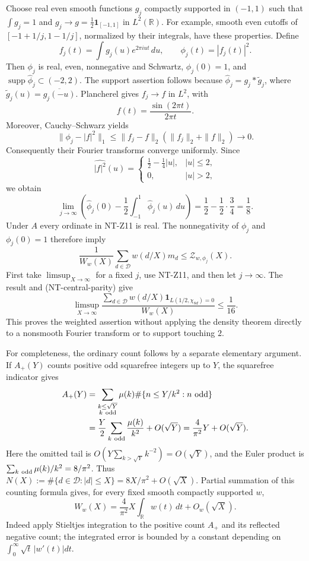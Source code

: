 \documentclass[11pt,a4paper]{article}
\begin{document}
Choose real even smooth functions $g_j$ compactly supported in $(-1,1)$
such that $\int g_j=1$ and
$g_j\to g=\tfrac12\mathbf1_{[-1,1]}$ in $L^2(\mathbb R)$.
For example, smooth even cutoffs of $[-1+1/j,1-1/j]$, normalized by
their integrals, have these properties.  Define
\[
 f_j(t)=\int g_j(u)e^{2\pi iut}\,du,\qquad
 \phi_j(t)=|f_j(t)|^2.
\]
Then $\phi_j$ is real, even, nonnegative and Schwartz,
$\phi_j(0)=1$, and
$\operatorname{supp}\widehat\phi_j\subset(-2,2)$.
The support assertion follows because
$\widehat\phi_j=g_j*\widetilde g_j$, where
$\widetilde g_j(u)=\overline{g_j(-u)}$.
Plancherel gives $f_j\to f$ in $L^2$, with
\[
 f(t)=\frac{\sin(2\pi t)}{2\pi t}.
\]
Moreover, Cauchy--Schwarz yields
\[
 \|\phi_j-|f|^2\|_1
 \le\|f_j-f\|_2(\|f_j\|_2+\|f\|_2)\longrightarrow0.
\]
Consequently their Fourier transforms converge uniformly.  Since
\[
 \widehat{|f|^2}(u)=
 \begin{cases}\tfrac12-\tfrac14|u|,&|u|\le2,\\0,&|u|>2,
 \end{cases}
\]
we obtain
\[
 \lim_{j\to\infty}
 \left(\widehat\phi_j(0)-\frac12
                   \int_{-1}^1\widehat\phi_j(u)\,du\right)
 =\frac12-\frac12\cdot\frac34=\frac18.
\tag{NT-test-limit}
\]
Under $A$ every ordinate in NT-Z11 is real.  The nonnegativity of
$\phi_j$ and $\phi_j(0)=1$ therefore imply
\[
 \frac1{W_w(X)}\sum_{d\in\mathcal D}w(d/X)m_d
 \le\mathcal Z_{w,\phi_j}(X).
\]
First take $\limsup_{X\to\infty}$ for a fixed $j$, use NT-Z11, and
then let $j\to\infty$.  The result and (NT-central-parity) give
\[
 \limsup_{X\to\infty}
 \frac{\sum_{d\in\mathcal D}w(d/X)
               \mathbf1_{L(1/2,\chi_{8d})=0}}{W_w(X)}\le\frac1{16}.
\tag{NT-weighted-vanishing}
\]
This proves the weighted assertion without applying the density theorem
directly to a nonsmooth Fourier transform or to support touching $2$.

For completeness, the ordinary count follows by a separate elementary
argument.  If $A_+(Y)$ counts positive odd squarefree integers up to $Y$,
the squarefree indicator gives
\begin{align*}
 A_+(Y)&=\sum_{\substack{k\le\sqrt Y\\k\ {\rm odd}}}\mu(k)
       \#\{n\le Y/k^2:n\ {\rm odd}\}\\
 &=\frac Y2\sum_{k\ {\rm odd}}\frac{\mu(k)}{k^2}+O(\sqrt Y)
 =\frac4{\pi^2}Y+O(\sqrt Y).
\end{align*}
Here the omitted tail is $O(Y\sum_{k>\sqrt Y}k^{-2})=O(\sqrt Y)$,
and the Euler product is
$\sum_{k\ {\rm odd}}\mu(k)/k^2=8/\pi^2$.
Thus $N(X):=\#\{d\in\mathcal D:|d|\le X\}
 =8X/\pi^2+O(\sqrt X)$.
Partial summation of this counting formula gives, for every fixed
smooth compactly supported $w$,
\[
 W_w(X)=\frac4{\pi^2}X\int_{\mathbb R}w(t)\,dt+O_w(\sqrt X).
\]
Indeed apply Stieltjes integration to the positive count $A_+$ and
its reflected negative count; the integrated error is bounded by a
constant depending on $\int_0^\infty\sqrt t\,|w'(t)|dt$.
\end{document}
